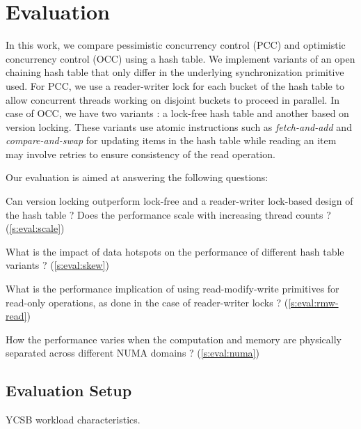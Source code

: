 \section{Evaluation}
\label{s:eval}

In this work, we compare pessimistic concurrency control (PCC) and optimistic
concurrency control (OCC) using a hash table. We implement variants of an open
chaining hash table that only differ in the underlying synchronization primitive
used. For PCC, we use a reader-writer lock for each bucket of the hash table to allow
concurrent threads working on disjoint buckets to proceed in parallel. In case of
OCC, we have two variants : a lock-free hash table and another based on
version locking. These variants use atomic instructions such as 
\textit{fetch-and-add} and \textit{compare-and-swap} for updating items in the
hash table while reading an item may involve retries to ensure consistency of the
read operation.

Our evaluation is aimed at answering the following questions:

\squishlists

\item Can version locking outperform lock-free and a reader-writer lock-based
design of the hash table ? Does the performance scale with increasing thread
counts ? (\autoref{s:eval:scale})

\item What is the impact of data hotspots on the performance of different
hash table variants ? (\autoref{s:eval:skew})

\item What is the performance implication of using read-modify-write primitives
for read-only operations, as done in the case of reader-writer locks ? 
(\autoref{s:eval:rmw-read})

\item How the performance varies when the computation and memory are physically
separated across different NUMA domains ? (\autoref{s:eval:numa})

\squishends

\subsection{Evaluation Setup}
\label{s:eval:env}

\begin{table}[t!]
    \centering
    \footnotesize
    \resizebox{\columnwidth}{!}{}
    \vspace{5px}
    \caption{
	YCSB workload characteristics.
    }
    \label{s:ycsb}
    \vspace{-5pt}
\end{table}


